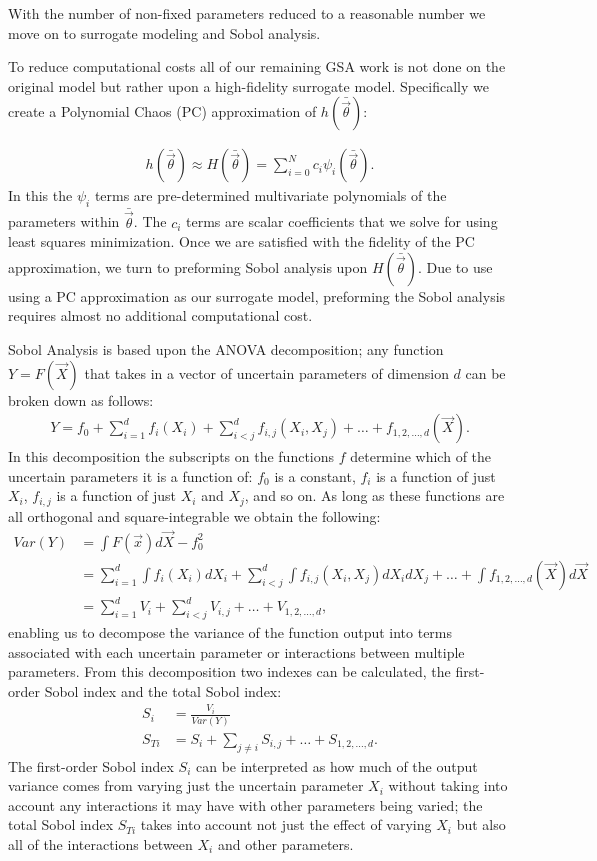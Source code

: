 \documentclass[10pt,letterpaper]{article}
\begin{document}
	With the number of non-fixed parameters reduced to a reasonable number we move on to surrogate modeling and Sobol analysis. 
	
	To reduce computational costs all of our remaining GSA work is not done on the original model but rather upon a high-fidelity surrogate model. Specifically we create a Polynomial Chaos (PC) approximation of $h(\bar{\vec{\theta}})$:
	
	\begin{align}
		h(\bar{\vec{\theta}}) \approx H(\bar{\vec{\theta}}) = \sum_{i=0}^N c_i \psi_i (\bar{\vec{\theta}}).
	\end{align}
	In this the $\psi_i$ terms are pre-determined multivariate polynomials of the parameters within $\bar{\vec{\theta}}$. The $c_i$ terms are scalar coefficients that we solve for using least squares minimization. Once we are satisfied with the fidelity of the PC approximation, we turn to preforming Sobol analysis upon $H(\bar{\vec{\theta}})$. Due to use using a PC approximation as our surrogate model, preforming the Sobol analysis requires almost no additional computational cost.
	
	Sobol Analysis is based upon the ANOVA decomposition; any function $Y=F(\vec{X})$ that takes in a vector of uncertain parameters of dimension $d$ can be broken down as follows:
	\begin{align}
		Y=f_0+\sum_{i=1}^d f_{i}(X_i)+ \sum_{i<j}^d f_{i,j}(X_i,X_j) + \ldots + f_{1,2,\ldots, d}(\vec{X}).
	\end{align}
	In this decomposition the subscripts on the functions $f$ determine which of the uncertain parameters it is a function of: $f_0$ is a constant, $f_i$ is a function of just $X_i$, $f_{i,j}$ is a function of just $X_i$ and $X_j$, and so on. As long as these functions are all orthogonal and square-integrable we obtain the following:
	\begin{align}
		Var(Y) &=\int F(\vec{x})d\vec{X} -f_0^2 \\
		&= \sum_{i=1}^d \int f_{i}(X_i)dX_i+ \sum_{i<j}^d \int f_{i,j}(X_i,X_j)dX_idX_j + \ldots + \int f_{1,2,\ldots, d}(\vec{X})d\vec{X} \\
		&= \sum_{i=1}^d V_i + \sum_{i<j}^d  V_{i,j} + \ldots + V_{1,2,\ldots,d},
	\end{align}
	enabling us to decompose the variance of the function output into terms associated with each uncertain parameter or interactions between multiple parameters. From this decomposition two indexes can be calculated, the first-order Sobol index and the total Sobol index:
	\begin{align}
		S_i&=\frac{V_i}{Var(Y)}\\
		S_{Ti}&=S_i+\sum_{j\neq i}S_{i,j}+\ldots+S_{1,2,\ldots,d}.
	\end{align}
	The first-order Sobol index $S_i$ can be interpreted as how much of the output variance comes from varying just the uncertain parameter $X_i$ without taking into account any interactions it may have with other parameters being varied; the total Sobol index $S_{Ti}$ takes into account not just the effect of varying  $X_i$ but also all of the interactions between $X_i$ and other parameters.
	
\end{document}

